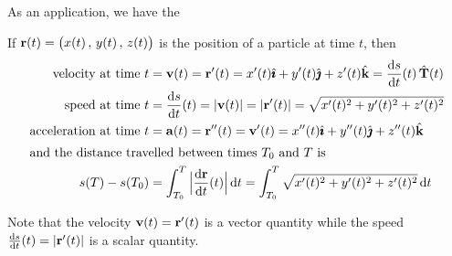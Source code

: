 As an application, we have the

\begin{lemma}\label{lem:CVvelocityEtc}
If $\mathbf{r}(t)=\big(x(t)\,,\,y(t)\,,\,z(t)\big)$ is the position of a 
particle at time $t$, then
\begin{align*}
\text{velocity at time $t$}
       &=\vv(t)=\vr'(t)=x'(t)\hi+y'(t)\hj+z'(t)\hk 
        = \diff{s}{t}(t)\,\hat\vT(t)\\
\text{speed at time $t$}
       &= \diff{s}{t}(t)=|\vv(t)|=|\vr'(t)|=\sqrt{x'(t)^2+y'(t)^2+z'(t)^2} \\
\text{acceleration at time $t$}
       &=\va(t)=\vr''(t)=\vv'(t)=x''(t)\hi + y''(t)\hj + z''(t)\hk \\
\intertext{and the distance travelled between times $T_0$ and $T$ is}
  s(T)-s(T_0)&= \int_{T_0}^T \Big|\diff{\vr}{t}(t)\Big|\,\dee{t}
       = \int_{T_0}^T \sqrt{x'(t)^2+y'(t)^2+z'(t)^2}\,\dee{t}
\end{align*}
\end{lemma}
Note that the velocity $\mathbf{v}(t) = \mathbf{r}'(t)$ is a vector quantity while the
speed $\diff{s}{t}(t)=|\vr'(t)|$ is a scalar quantity.
\goodbreak


